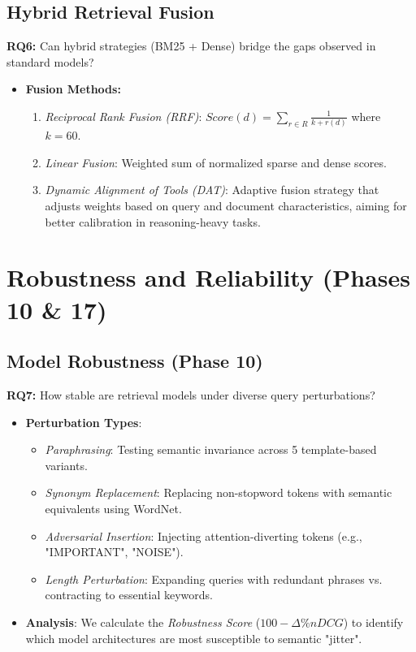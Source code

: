 \documentclass[sigconf]{acmart}
\begin{document}
\subsection{Hybrid Retrieval Fusion}
\textbf{RQ6:} Can hybrid strategies (BM25 + Dense) bridge the gaps observed in standard models?
\begin{itemize}
    \item \textbf{Fusion Methods:} 
    \begin{enumerate}
        \item \textit{Reciprocal Rank Fusion (RRF)}: $Score(d) = \sum_{r \in R} \frac{1}{k + r(d)}$ where $k=60$.
        \item \textit{Linear Fusion}: Weighted sum of normalized sparse and dense scores.
        \item \textit{Dynamic Alignment of Tools (DAT)}: Adaptive fusion strategy that adjusts weights based on query and document characteristics, aiming for better calibration in reasoning-heavy tasks.
    \end{enumerate}
\end{itemize}

\section{Robustness and Reliability (Phases 10 \& 17)}
\subsection{Model Robustness (Phase 10)}
\textbf{RQ7:} How stable are retrieval models under diverse query perturbations?
\begin{itemize}
    \item \textbf{Perturbation Types}:
    \begin{itemize}
        \item \textit{Paraphrasing}: Testing semantic invariance across 5 template-based variants.
        \item \textit{Synonym Replacement}: Replacing non-stopword tokens with semantic equivalents using WordNet.
        \item \textit{Adversarial Insertion}: Injecting attention-diverting tokens (e.g., "IMPORTANT", "NOISE").
        \item \textit{Length Perturbation}: Expanding queries with redundant phrases vs. contracting to essential keywords.
    \end{itemize}
    \item \textbf{Analysis}: We calculate the \textit{Robustness Score} ($100 - \Delta\% nDCG$) to identify which model architectures are most susceptible to semantic "jitter".
\end{itemize}
\end{document}
